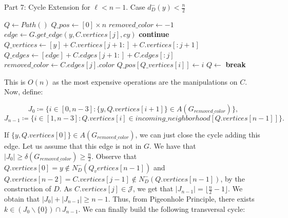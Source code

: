 \begin{algorithm}[H]
    \caption{Part 7: Cycle Extension for \( \ell < n - 1 \). Case \( d^-_D(y) < \frac{n}{2} \)}
    \begin{algorithmic}[1]
            \State $Q \gets Path()$
            \State $Q\_pos \gets [0] \times n$
            \State $removed\_color \gets -1$
                \State $edge \gets G.get\_edge(y, C.vertices[j], cy)$
                    \State \textbf{continue}
                \EndIf
                \State $Q\_vertices \gets [y] + C.vertices[j + 1:] + C.vertices[:j + 1]$
                \State $Q\_edges \gets [edge] + C.edges[j + 1:] + C.edges[:j]$
                \State $removed\_color \gets C.edges[j].color$
                    \State $Q\_pos[Q\_vertices[i]] \gets i$
                \EndFor
                \State $Q \gets$ 
                \State \textbf{break}
            \EndFor
        \EndFunction
    \end{algorithmic}
\end{algorithm}

This is $O(n)$ as the most expensive operations are the manipulations on $C$.
Now, define:

\begin{equation}
    J_0 \coloneqq \{i \in [0, n - 3]: \{y, Q.vertices[i+1]\} \in A(G_{removed\_color})\},
\end{equation}
\begin{equation}
    J_{n-1} \coloneqq \{i \in [1, n - 3] : Q.vertices[i] \in incoming\_neighborhood[Q.vertices[n - 1]]\}.
\end{equation}

If $\{y, Q.vertices[0]\} \in A(G_{removed\_color})$, we can just close the cycle adding this edge.
Let us assume that this edge is not in $G$. We have that $|J_0| \geq \delta(G_{removed\_color}) \geq \frac{n}{2}$.
Observe that $Q.vertices[0] = y \notin N^-_D(Q_vertices[n - 1])$ and $Q.vertices[n - 2] = C.vertices[j - 1] \notin N^-_D(Q.vertices[n - 1])$,
by the construction of $D$. As $C.vertices[j] \in \mathcal{J}$, we get that
$|J_{n-1}| = \lfloor \frac{n}{2} - 1 \rfloor$. We obtain that $|J_0| + |J_{n-1}| \geq n - 1$.
Thus, from Pigeonhole Principle, there exists $k \in (J_0 \backslash \{0\}) \cap J_{n-1}$. 
We can finally build the following transversal cycle:

